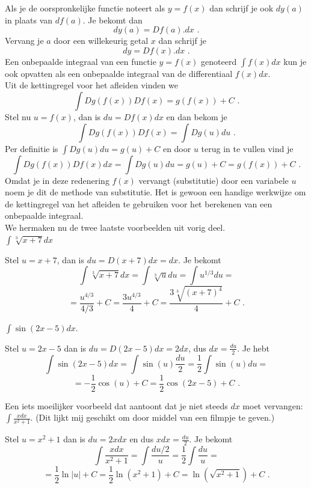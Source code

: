 \documentclass{article}
\begin{document}
Als je de oorspronkelijke functie noteert als $y=f(x)$ dan schrijf je ook $dy(a)$ in plaats van $df(a)$.
Je bekomt dan
\[
dy(a)=Df(a).dx \text { .}
\]
Vervang je $a$ door een willekeurig getal $x$ dan schrijf je
\[
dy=Df(x).dx \text { .}
\]
Een onbepaalde integraal van een functie $y=f(x)$ genoteerd $\int f(x)dx$ kun je ook opvatten als een onbepaalde integraal van de differentiaal $f(x)dx$.\\

Uit de kettingregel voor het afleiden vinden we
\[
\int Dg(f(x))Df(x)=g(f(x))+C \text { .}
\]
Stel nu $u=f(x)$, dan is $du=Df(x)dx$ en dan bekom je
\[
\int Dg(f(x))Df(x)=\int Dg(u)du \text { .}
\]
Per definitie is $\int Dg(u)du=g(u)+C$ en door $u$ terug in te vullen vind je
\[
\int Dg(f(x))Df(x)dx=\int Dg(u)du=g(u)+C=g(f(x))+C \text { .}
\]
Omdat je in deze redenering $f(x)$ vervangt (substitutie) door een variabele $u$ noem je dit de methode van substitutie.
Het is gewoon een handige werkwijze om de kettingregel van het afleiden te gebruiken voor het berekenen van een onbepaalde integraal.\\

We hermaken nu de twee laatste voorbeelden uit vorig deel.\\

\noindent $\int \sqrt[3]{x+7} dx$

Stel $u=x+7$, dan is $du=D(x+7)dx=dx$.
Je bekomt
\[
\int \sqrt[3]{x+7}dx=\int \sqrt[3]{u}du=\int u^{1/3} du=
\]
\[
=\frac{u^{4/3}}{4/3}+C=\frac{3u^{4/3}}{4}+C=\frac {3\sqrt[3]{(x+7)^4}}{4}+C \text { .}
\]

\vspace{2mm}

\noindent $\int \sin (2x-5)dx$.

Stel $u=2x-5$ dan is $du=D(2x-5)dx=2dx$, dus $dx=\frac{du}{2}$.
Je hebt
\[
\int \sin (2x-5)dx=\int \sin(u) \frac{du}{2}=\frac{1}{2} \int \sin (u)du=
\]
\[
=-\frac{1}{2} \cos (u)+C=\frac{1}{2} \cos (2x-5)+C \text { .}
\]

\vspace{2mm}

Een iets moeilijker voorbeeld dat aantoont dat je niet steeds $dx$ moet vervangen: $\int \frac{xdx}{x^2+1}$.
\noindent (Dit lijkt mij geschikt om door middel van een filmpje te geven.)

Stel $u=x^2+1$ dan is $du=2xdx$ en dus $xdx=\frac{du}{2}$.
Je bekomt
\[
\int \frac{xdx}{x^2+1}=\int \frac{du/2}{u}=\frac{1}{2} \int \frac{du}{u}=
\]
\[
=\frac{1}{2} \ln \vert u \vert +C=\frac{1}{2} \ln \left( x^2+1 \right)+C=\ln \left( \sqrt{x^2+1} \right)+C \text { .}
\]
\end{document}
